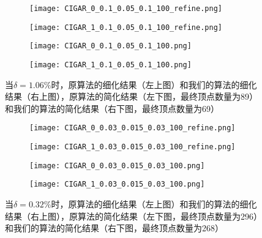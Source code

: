 \begin{figure}[htbp]
  \centering
  \begin{subfigure}[b]{0.4\textwidth}
    \texttt{[image: CIGAR\_0\_0.1\_0.05\_0.1\_100\_refine.png]}
  \end{subfigure}
  \begin{subfigure}[b]{0.4\textwidth}
    \texttt{[image: CIGAR\_1\_0.1\_0.05\_0.1\_100\_refine.png]}
  \end{subfigure}
  \begin{subfigure}[b]{0.4\textwidth}
    \texttt{[image: CIGAR\_0\_0.1\_0.05\_0.1\_100.png]}
  \end{subfigure}
  \begin{subfigure}[b]{0.4\textwidth}
    \texttt{[image: CIGAR\_1\_0.1\_0.05\_0.1\_100.png]}
  \end{subfigure}
  \caption[当$\delta=1.06\%$时cigar结果对比]{当$\delta=1.06\%$时，原算法的细化结果（左上图）和我们的算法的细化结果（右上图），原算法的简化结果（左下图，最终顶点数量为89）和我们的算法的简化结果（右下图，最终顶点数量为69）}
  \label{fig:cigar-res1}
\end{figure}

\begin{figure}[htbp]
  \centering
  \begin{subfigure}[b]{0.4\textwidth}
    \texttt{[image: CIGAR\_0\_0.03\_0.015\_0.03\_100\_refine.png]}
  \end{subfigure}
  \begin{subfigure}[b]{0.4\textwidth}
    \texttt{[image: CIGAR\_1\_0.03\_0.015\_0.03\_100\_refine.png]}
  \end{subfigure}
  \begin{subfigure}[b]{0.4\textwidth}
    \texttt{[image: CIGAR\_0\_0.03\_0.015\_0.03\_100.png]}
  \end{subfigure}
  \begin{subfigure}[b]{0.4\textwidth}
    \texttt{[image: CIGAR\_1\_0.03\_0.015\_0.03\_100.png]}
  \end{subfigure}
  \caption[当$\delta=0.32\%$时cigar结果对比]{当$\delta=0.32\%$时，原算法的细化结果（左上图）和我们的算法的细化结果（右上图），原算法的简化结果（左下图，最终顶点数量为296）和我们的算法的简化结果（右下图，最终顶点数量为268）}
  \label{fig:cigar-res2}
\end{figure}


